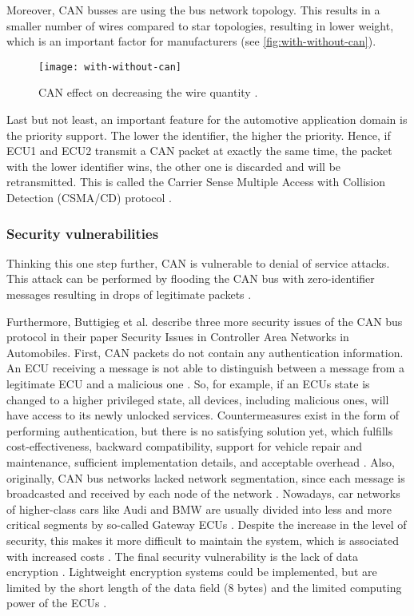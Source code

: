 Moreover, CAN busses are using the bus network topology. This results in a smaller number of wires compared to star topologies, resulting in lower weight, which is an important factor for manufacturers (see \autoref{fig:with-without-can}).

\begin{figure}[h]
    \centering
    \texttt{[image: with-without-can]}
    \caption{CAN effect on decreasing the wire quantity \cite{Sharma2016}.}
    \label{fig:with-without-can}
\end{figure}

Last but not least, an important feature for the automotive application domain is the priority support. The lower the identifier, the higher the priority. Hence, if ECU1 and ECU2 transmit a CAN packet at exactly the same time, the packet with the lower identifier wins, the other one is discarded and will be retransmitted. This is called the Carrier Sense Multiple Access with Collision Detection (CSMA/CD) protocol \cite{Sharma2016}.

\subsubsection{Security vulnerabilities}

Thinking this one step further, CAN is vulnerable to denial of service attacks. This attack can be performed by flooding the CAN bus with zero-identifier messages resulting in drops of legitimate packets \cite{Buttigieg2017}.

Furthermore, Buttigieg et al. \cite{Buttigieg2017} describe three more security issues of the CAN bus protocol in their paper {Security Issues in Controller Area Networks in Automobiles}.
First, CAN packets do not contain any authentication information. An ECU receiving a message is not able to distinguish between a message from a legitimate ECU and a malicious one \cite{Buttigieg2017}. So, for example, if an ECUs state is changed to a higher privileged state, all devices, including malicious ones, will have access to its newly unlocked services. Countermeasures exist in the form of performing authentication, but there is no satisfying solution yet, which fulfills cost-effectiveness, backward compatibility, support for vehicle repair and maintenance, sufficient implementation details, and acceptable overhead \cite{Bozdal2020}.
Also, originally, CAN bus networks lacked network segmentation, since each message is broadcasted and received by each node of the network \cite{Buttigieg2017}. Nowadays, car networks of higher-class cars like Audi and BMW are usually divided into less and more critical segments by so-called Gateway ECUs \cite{Bozdal2020}. Despite the increase in the level of security, this makes it more difficult to maintain the system, which is associated with increased costs \cite{Bozdal2020}.
The final security vulnerability is the lack of data encryption \cite{Buttigieg2017}. Lightweight encryption systems could be implemented, but are limited by the short length of the data field (8 bytes) and the limited computing power of the ECUs \cite{Bozdal2020}.

